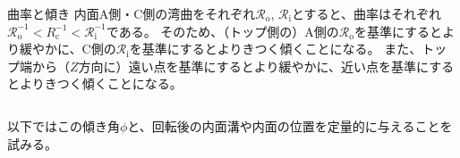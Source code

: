\begin{Column}{曲率と傾き}
内面A側・C側の湾曲をそれぞれ$\mathcal R_\mathrm o$, $\mathcal R_\mathrm i$とすると、曲率はそれぞれ$\mathcal R_\mathrm o^{-1} < R_\mathrm c^{-1} < \mathcal R_\mathrm i^{-1}$である。
そのため、（トップ側の）A側の$\mathcal R_\mathrm o$を基準にするとより緩やかに、C側の$\mathcal R_\mathrm i$を基準にするとよりきつく傾くことになる。
また、トップ端から（$Z$方向に）遠い点を基準にするとより緩やかに、近い点を基準にするとよりきつく傾くことになる。
\end{Column}

以下ではこの傾き角$\phi$と、回転後の内面溝や内面の位置を定量的に与えることを試みる。




\clearpage
